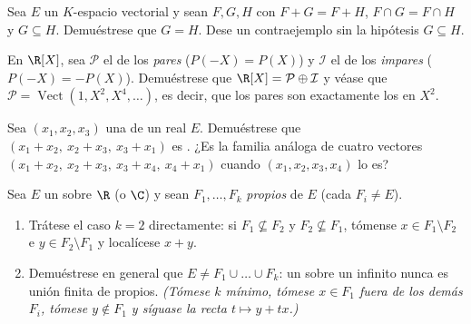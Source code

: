 \begin{exercise}[$\star\star\star$]\label{exo:b1:vspaces:9}
Sea $E$ un $K$-espacio vectorial y sean $F, G, H$  con
$F + G = F + H$, $F \cap G = F \cap H$ y $G \subseteq H$. Demuéstrese
que $G = H$. Dese un contraejemplo sin la hipótesis $G \subseteq H$.
\end{exercise}

\begin{exercise}[$\star\star$]\label{exo:b1:vspaces:10}
En $\R[X]$, sea $\mathcal P$ el  de los 
\emph{pares} ($P(-X) = P(X)$) y $\mathcal I$ el  de los
\emph{impares} ($P(-X) = -P(X)$). Demuéstrese que
$\R[X] = \mathcal P \oplus \mathcal I$ y véase que
$\mathcal P = \operatorname{Vect}(1, X^2, X^4, \dots)$, es decir, que
los  pares son exactamente los  en $X^2$.
\end{exercise}

\begin{exercise}[$\star\star$]\label{exo:b1:vspaces:11}
Sea $(x_1, x_2, x_3)$ una  de un 
real $E$. Demuéstrese que $(x_1 + x_2,\ x_2 + x_3,\ x_3 + x_1)$ es
. ¿Es  la familia análoga de cuatro vectores
$(x_1 + x_2,\ x_2 + x_3,\ x_3 + x_4,\ x_4 + x_1)$ cuando
$(x_1, x_2, x_3, x_4)$ lo es?
\end{exercise}

\begin{exercise}[$\star\star\star$]\label{exo:b1:vspaces:12}
Sea $E$ un  sobre $\R$ (o $\C$) y sean
$F_1, \dots, F_k$  \emph{propios} de $E$ (cada
$F_i \neq E$).
\begin{enumerate}
  \item Trátese el caso $k = 2$ directamente: si
        $F_1 \not\subseteq F_2$ y $F_2 \not\subseteq F_1$, tómense
        $x \in F_1 \setminus F_2$ e $y \in F_2 \setminus F_1$ y
        localícese $x + y$.
  \item Demuéstrese en general que $E \neq F_1 \cup \dots \cup F_k$:
        un  sobre un  infinito nunca es unión
        finita de  propios. \emph{(Tómese $k$ mínimo,
        tómese $x \in F_1$ fuera de los demás $F_i$, tómese
        $y \notin F_1$ y síguase la recta $t \mapsto y + tx$.)}
\end{enumerate}
\end{exercise}

